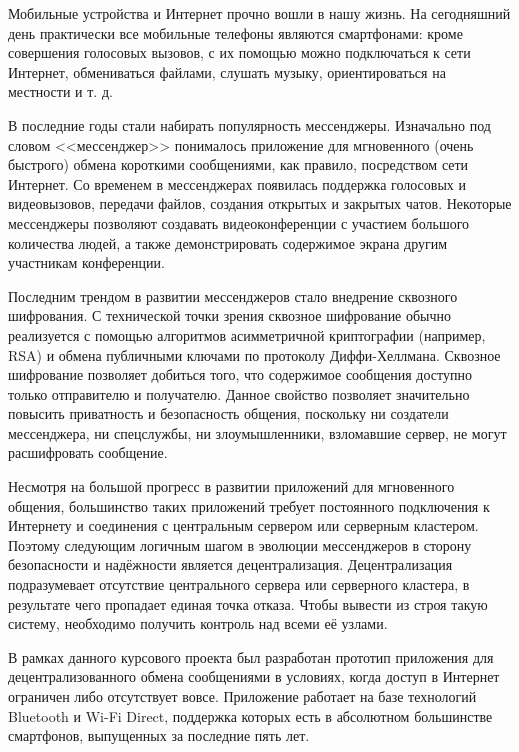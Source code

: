 
\label{sec:intro}

Мобильные устройства и Интернет прочно вошли в нашу жизнь.
На сегодняшний день практически все мобильные телефоны являются смартфонами: кроме совершения голосовых вызовов, с их помощью можно подключаться к сети Интернет, обмениваться файлами, слушать музыку, ориентироваться на местности и т. д.

В последние годы стали набирать популярность мессенджеры.
Изначально под словом <<мессенджер>> понималось приложение для мгновенного (очень быстрого) обмена короткими сообщениями, как правило, посредством сети Интернет.
Со временем в мессенджерах появилась поддержка голосовых и видеовызовов, передачи файлов, создания открытых и закрытых чатов.
Некоторые мессенджеры позволяют создавать видеоконференции с участием большого количества людей, а также демонстрировать содержимое экрана другим участникам конференции.

Последним трендом в развитии мессенджеров стало внедрение сквозного шифрования.
С технической точки зрения сквозное шифрование обычно реализуется с помощью алгоритмов асимметричной криптографии (например, RSA) и обмена публичными ключами по протоколу Диффи-Хеллмана. Сквозное шифрование позволяет добиться того, что содержимое сообщения доступно только отправителю и получателю.
Данное свойство позволяет значительно повысить приватность и безопасность общения, поскольку ни создатели мессенджера, ни спецслужбы, ни злоумышленники, взломавшие сервер, не могут расшифровать сообщение.

Несмотря на большой прогресс в развитии приложений для мгновенного общения, большинство таких приложений требует постоянного подключения к Интернету и соединения с центральным сервером или серверным кластером.
Поэтому следующим логичным шагом в эволюции мессенджеров в сторону безопасности и надёжности является децентрализация.
Децентрализация подразумевает отсутствие центрального сервера или серверного кластера, в результате чего пропадает единая точка отказа.
Чтобы вывести из строя такую систему, необходимо получить контроль над всеми её узлами.

В рамках данного курсового проекта был разработан прототип приложения для децентрализованного обмена сообщениями в условиях, когда доступ в Интернет ограничен либо отсутствует вовсе.
Приложение работает на базе технологий Bluetooth и Wi-Fi Direct, поддержка которых есть в абсолютном большинстве смартфонов, выпущенных за последние пять лет.
